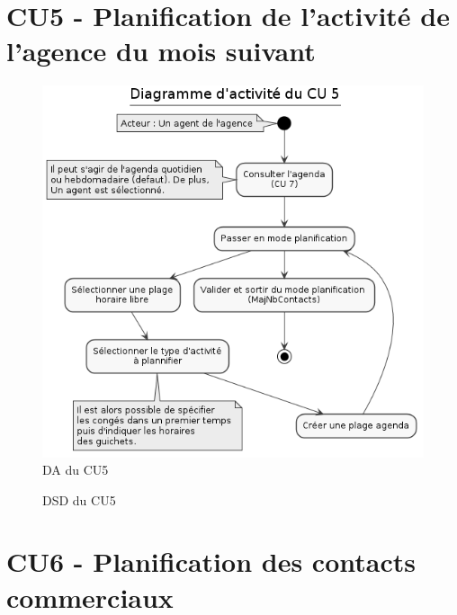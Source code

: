 \clearpage
\section{CU5 - Planification de l’activité de l’agence du mois suivant}

\begin{figure}[h]
\centering
\includegraphics[width=\textwidth]{figures/DA_CU5.png}
\caption{DA du CU5}
\end{figure}

\begin{figure}[h]
\centering
\caption{DSD du CU5}
\end{figure}

\clearpage
\section{CU6 - Planification des contacts commerciaux}


